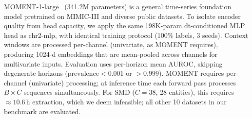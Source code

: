 \documentclass{article}
\begin{document}
MOMENT-1-large~\citep{goswami2024moment} (341.2M parameters) is a general time-series foundation model pretrained on MIMIC-III and diverse public datasets. To isolate encoder quality from head capacity, we apply the same 198K-param dt-conditioned MLP head as chr2-mlp, with identical training protocol (100\% labels, 3 seeds). Context windows are processed per-channel (univariate, as MOMENT requires), producing 1024-d embeddings that are mean-pooled across channels for multivariate inputs. Evaluation uses per-horizon mean AUROC, skipping degenerate horizons ($\text{prevalence} < 0.001$ or $> 0.999$). MOMENT requires per-channel (univariate) processing; at inference time each forward pass processes $B{\times}C$ sequences simultaneously. For SMD ($C{=}38$, 28 entities), this requires ${\approx}10.6$\,h extraction, which we deem infeasible; all other 10 datasets in our benchmark are evaluated.
\end{document}
